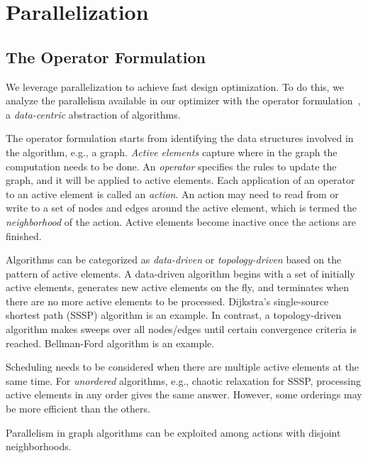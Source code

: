 \section{Parallelization}
\label{sec:parallel}

\subsection{The Operator Formulation}

We leverage parallelization to achieve fast design optimization. To do this, we analyze the parallelism available in our optimizer with the operator formulation~\cite{pingali11}, a {\em data-centric} abstraction of algorithms.

The operator formulation starts from identifying the data structures involved in the algorithm, e.g., a graph. {\em Active elements} capture where in the graph the computation needs to be done. An {\em operator} specifies the rules to update the graph, and it will be applied to active elements. Each application of an operator to an active element is called an {\em action}. An action may need to read from or write to a set of nodes and edges around the active element, which is termed the {\em neighborhood} of the action. Active elements become inactive once the actions are finished.

Algorithms can be categorized as {\em data-driven} or {\em topology-driven} based on the pattern of active elements. A data-driven algorithm begins with a set of initially active elements, generates new active elements on the fly, and terminates when there are no more active elements to be processed. Dijkstra's single-source shortest path (SSSP) algorithm is an example. In contrast, a topology-driven algorithm makes sweeps over all nodes/edges until certain convergence criteria is reached. Bellman-Ford algorithm is an example.

Scheduling needs to be considered when there are multiple active elements at the same time. For {\em unordered} algorithms, e.g., chaotic relaxation for SSSP, processing active elements in any order gives the same answer. However, some orderings may be more efficient than the others.


Parallelism in graph algorithms can be exploited among actions with disjoint neighborhoods.

